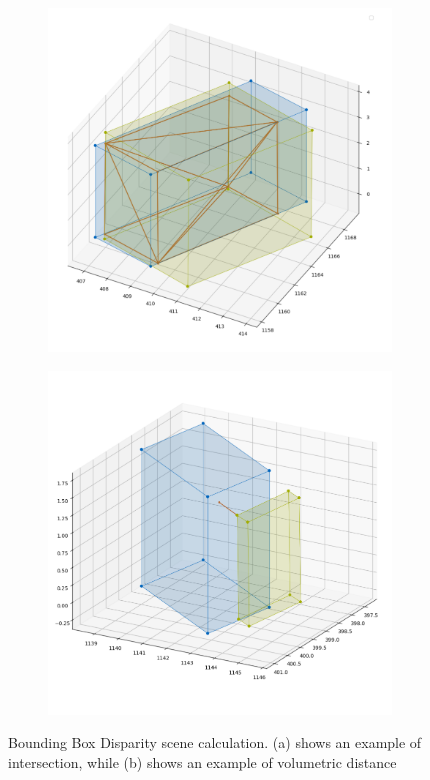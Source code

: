 \begin{figure}[h!]
    \centering
    \begin{subfigure}[b]{0.45\textwidth}
        \includegraphics[width=\textwidth]{images/methodology/frame_0_3d_bb.png}
        \caption{}
        \label{fig:bbox_disparity_a}
    \end{subfigure}
    \begin{subfigure}[b]{0.45\textwidth}
        \includegraphics[width=\textwidth]{images/methodology/frame_2_3d_bb.png}
        \caption{}
        \label{fig:bbox_disparity_b}
    \end{subfigure}
    \caption{Bounding Box Disparity scene calculation. (a) shows an example of intersection, while (b) shows an example of volumetric distance}
    \label{fig:bbox_disparity}
\end{figure}

